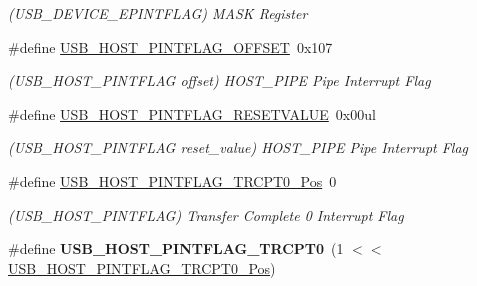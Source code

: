 \begin{DoxyCompactItemize}
\begin{DoxyCompactList}\small\item\em (U\+S\+B\+\_\+\+D\+E\+V\+I\+C\+E\+\_\+\+E\+P\+I\+N\+T\+F\+L\+A\+G) M\+A\+S\+K Register \end{DoxyCompactList}\item 
\hypertarget{group___s_a_m_l21___u_s_b_gabde50c13998aefad803aa1bc5bb632ca}{}\#define \hyperlink{group___s_a_m_l21___u_s_b_gabde50c13998aefad803aa1bc5bb632ca}{U\+S\+B\+\_\+\+H\+O\+S\+T\+\_\+\+P\+I\+N\+T\+F\+L\+A\+G\+\_\+\+O\+F\+F\+S\+E\+T}~0x107\label{group___s_a_m_l21___u_s_b_gabde50c13998aefad803aa1bc5bb632ca}

\begin{DoxyCompactList}\small\item\em (U\+S\+B\+\_\+\+H\+O\+S\+T\+\_\+\+P\+I\+N\+T\+F\+L\+A\+G offset) H\+O\+S\+T\+\_\+\+P\+I\+P\+E Pipe Interrupt Flag \end{DoxyCompactList}\item 
\hypertarget{group___s_a_m_l21___u_s_b_ga380c80e8759c1b60946f0aaa79272179}{}\#define \hyperlink{group___s_a_m_l21___u_s_b_ga380c80e8759c1b60946f0aaa79272179}{U\+S\+B\+\_\+\+H\+O\+S\+T\+\_\+\+P\+I\+N\+T\+F\+L\+A\+G\+\_\+\+R\+E\+S\+E\+T\+V\+A\+L\+U\+E}~0x00ul\label{group___s_a_m_l21___u_s_b_ga380c80e8759c1b60946f0aaa79272179}

\begin{DoxyCompactList}\small\item\em (U\+S\+B\+\_\+\+H\+O\+S\+T\+\_\+\+P\+I\+N\+T\+F\+L\+A\+G reset\+\_\+value) H\+O\+S\+T\+\_\+\+P\+I\+P\+E Pipe Interrupt Flag \end{DoxyCompactList}\item 
\hypertarget{group___s_a_m_l21___u_s_b_ga49eea3cf8bffb9a21f866b05df261edc}{}\#define \hyperlink{group___s_a_m_l21___u_s_b_ga49eea3cf8bffb9a21f866b05df261edc}{U\+S\+B\+\_\+\+H\+O\+S\+T\+\_\+\+P\+I\+N\+T\+F\+L\+A\+G\+\_\+\+T\+R\+C\+P\+T0\+\_\+\+Pos}~0\label{group___s_a_m_l21___u_s_b_ga49eea3cf8bffb9a21f866b05df261edc}

\begin{DoxyCompactList}\small\item\em (U\+S\+B\+\_\+\+H\+O\+S\+T\+\_\+\+P\+I\+N\+T\+F\+L\+A\+G) Transfer Complete 0 Interrupt Flag \end{DoxyCompactList}\item 
\hypertarget{group___s_a_m_l21___u_s_b_ga88bb715ba11624f1e63da9985255348b}{}\#define {\bfseries U\+S\+B\+\_\+\+H\+O\+S\+T\+\_\+\+P\+I\+N\+T\+F\+L\+A\+G\+\_\+\+T\+R\+C\+P\+T0}~(1 $<$$<$ \hyperlink{group___s_a_m_l21___u_s_b_ga49eea3cf8bffb9a21f866b05df261edc}{U\+S\+B\+\_\+\+H\+O\+S\+T\+\_\+\+P\+I\+N\+T\+F\+L\+A\+G\+\_\+\+T\+R\+C\+P\+T0\+\_\+\+Pos})\label{group___s_a_m_l21___u_s_b_ga88bb715ba11624f1e63da9985255348b}


\end{DoxyCompactItemize}
